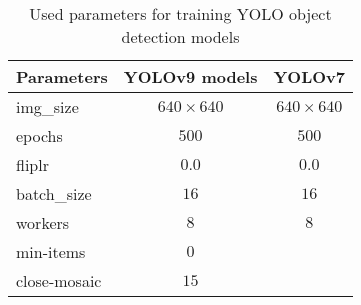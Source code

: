 \begin{table}[H]
    \centering
    \begin{tabular}{|l|c|c|}
        \hline
        \textbf{Parameters} & \textbf{YOLOv9 models} & \textbf{YOLOv7}\\
        \hline
        img\_size & $640 \times 640$ & $640 \times 640$ \\
        \hline
        epochs & $500$ & $500$\\
        \hline
        fliplr & $0.0$ & $0.0$\\
        \hline
        batch\_size& $16$ & $16$\\
        \hline
        workers & $8$ & $8$\\
        \hline
        min-items & $0$ & \\
        \hline
        close-mosaic & $15$ & \\
        \hline
    \end{tabular}
    \caption{Used parameters for training \ac{YOLO} object detection models}
    \label{tab:usedParametersYOLOs}
\end{table}